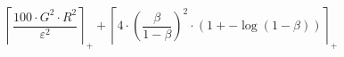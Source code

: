 \[\left\lceil \frac{100 \cdot G^{2} \cdot R^{2}}{\varepsilon^{2}} \right\rceil_{+} + \left\lceil 4 \cdot \left(\frac{\beta}{1 - \beta}\right)^{2} \cdot \left(1 + -\log\left(1 - \beta\right)\right) \right\rceil_{+}\]
